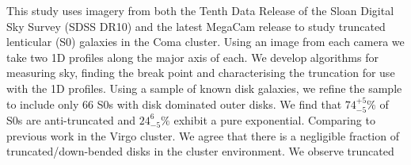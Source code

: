 
This study uses \iband imagery from both the Tenth Data Release of the Sloan Digital Sky Survey (SDSS DR10) and the latest MegaCam release to study truncated lenticular (S0) galaxies in the Coma cluster. Using an image from each camera we take two 1D profiles along the major axis of each. We develop algorithms for measuring sky, finding the break point and characterising the truncation for use with the 1D profiles. Using a sample of known disk galaxies, we refine the sample to include only 66 S0s with disk dominated outer disks. We find that $74^{+5}_{-5}\%$ of S0s are anti-truncated and $24^{6}_{-5}\%$ exhibit a pure exponential. Comparing to previous work in the Virgo cluster. We agree that there is a negligible fraction of truncated/down-bended disks in the cluster environment. We observe truncated
